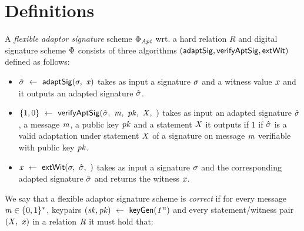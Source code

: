 \section{Definitions}
\label{sec:definitions}


\begin{definition}
A \emph{flexible adaptor signature} scheme $\Phi_{\mathit{Apt}}$ wrt. a hard relation $R$ and digital signature scheme $\Phi$	consists of three algorithms $(\mathsf{adaptSig}, \mathsf{verifyAptSig}, \mathsf{extWit})$ defined as follows:


\begin{itemize}
        \item $\hat{\sigma} ~\leftarrow~ \mathsf{adaptSig}(\sigma ,~ \mathit{x})$ takes as input a signature $\sigma$ and a witness value $\mathit{x}$ and it outputs an adapted signature $\hat{\sigma}$. 
        \item $\{1,0\} ~\leftarrow~ \mathsf{verifyAptSig}(\hat{\sigma} ,~ \mathit{m} ,~ \mathit{pk} ,~ \mathit{X} ,~ )$ takes as input an adapted signature $\hat{\sigma}$, a message $\mathit{m}$, a public key $\mathit{pk}$ and a statement $\mathit{X}$ it outputs if $1$ if $\hat{\sigma}$ is a valid adaptation under statement $\mathit{X}$ of a signature on message $\mathit{m}$ verifiable with public key $\mathit{pk}$. 
        \item $\mathit{x} ~\leftarrow~ \mathsf{extWit}(\sigma ,~ \hat{\sigma} ,~ )$ takes as input a signature $\sigma$ and the corresponding adapted signature $\hat{\sigma}$ and returns the witness $\mathit{x}$.
    \end{itemize}

\end{definition}



\begin{definition}
We say that a flexible adaptor signature scheme is \emph{correct} if for every message $\mathit{m} \in \{0,1\}^{*}$, keypairs $(\mathit{sk}, \mathit{pk}) ~\leftarrow~ \mathsf{keyGen}(\mathit{1^n})$ and every statement/witness pair $(\mathit{X} ,~ \mathit{x})$ in a relation $\mathit{R}$ it must hold that:

\end{definition}